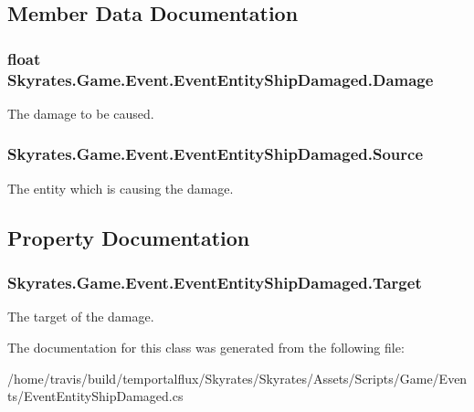 \subsection{Member Data Documentation}
\hypertarget{class_skyrates_1_1_game_1_1_event_1_1_event_entity_ship_damaged_a583f5c357fdeee25125bc549a57eb026}{
\subsubsection[{Damage}]{\setlength{\rightskip}{0pt plus 5cm}float Skyrates.\-Game.\-Event.\-Event\-Entity\-Ship\-Damaged.\-Damage}}\label{class_skyrates_1_1_game_1_1_event_1_1_event_entity_ship_damaged_a583f5c357fdeee25125bc549a57eb026}


The damage to be caused. 

\hypertarget{class_skyrates_1_1_game_1_1_event_1_1_event_entity_ship_damaged_ac1b8360317a40113c209e6e072e05fc4}{
\subsubsection[{Source}]{ Skyrates.\-Game.\-Event.\-Event\-Entity\-Ship\-Damaged.\-Source}}\label{class_skyrates_1_1_game_1_1_event_1_1_event_entity_ship_damaged_ac1b8360317a40113c209e6e072e05fc4}


The entity which is causing the damage. 



\subsection{Property Documentation}
\hypertarget{class_skyrates_1_1_game_1_1_event_1_1_event_entity_ship_damaged_a7be9590b3c01d4390b94a9b428196504}{
\subsubsection[{Target}]{ Skyrates.\-Game.\-Event.\-Event\-Entity\-Ship\-Damaged.\-Target\hspace{0.3cm}{\ttfamily [get]}}}\label{class_skyrates_1_1_game_1_1_event_1_1_event_entity_ship_damaged_a7be9590b3c01d4390b94a9b428196504}


The target of the damage. 



The documentation for this class was generated from the following file\-:\begin{DoxyCompactItemize}
\item 
/home/travis/build/temportalflux/\-Skyrates/\-Skyrates/\-Assets/\-Scripts/\-Game/\-Events/Event\-Entity\-Ship\-Damaged.\-cs\end{DoxyCompactItemize}
